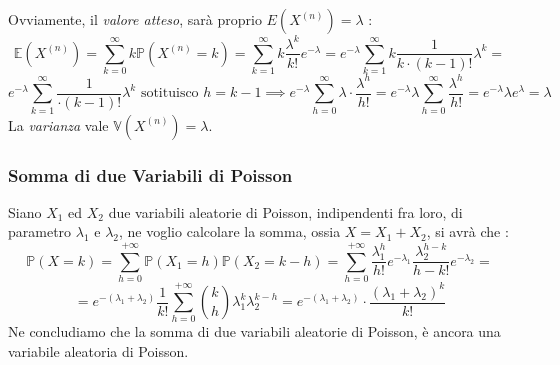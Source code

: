 \documentclass[12pt, letterpaper]{article}
\newcommand{\E}{{\mathbb E}}
\newcommand{\V}{{\mathbb V}}
\newcommand{\Prob}{{\mathbb P}}
\begin{document}
Ovviamente, il \textit{valore atteso}, sarà proprio  \(E(X^{(n)})=\lambda\) : \begin{equation}
    \E(X^{(n)})=\sum_{k=0}^\infty k\Prob(X^{(n)}=k)=\sum_{k=1}^\infty k\dfrac{\lambda^k}{k!}e^{-\lambda}=e^{-\lambda}\sum_{k=1}^\infty k\dfrac{1}{k\cdot(k-1)!}\lambda^k
=\end{equation}\begin{equation}
    e^{-\lambda}\sum_{k=1}^\infty \dfrac{1}{\cdot(k-1)!}\lambda^k \text{ sotituisco }h=k-1\implies e^{-\lambda}\sum_{h=0}^\infty\lambda\cdot\dfrac{\lambda^h}{h!}=
    e^{-\lambda}\lambda\sum_{h=0}^\infty\dfrac{\lambda^h}{h!}=e^{-\lambda}\lambda e^{\lambda}=\lambda
\end{equation}
La \textit{varianza} vale \(\V(X^{(n)})=\lambda\).
\subsubsection{Somma di due Variabili di Poisson}
Siano \(X_1\) ed \(X_2\) due variabili aleatorie di Poisson, indipendenti fra loro, di parametro \(\lambda_1\) e \(\lambda_2\),
ne voglio calcolare la somma, ossia \(X=X_1+X_2\), si avrà che : \begin{equation}
    \Prob(X=k)=\sum_{h=0}^{+\infty}\Prob(X_1=h)\Prob(X_2=k-h)=\sum_{h=0}^{+\infty}\dfrac{\lambda_1^h}{h!}e^{-\lambda_1}\dfrac{\lambda_2^{h-k}}{{h-k}!}e^{-\lambda_2}=
\end{equation}
\begin{equation}
    =e^{-(\lambda_1+\lambda_2)}\dfrac{1}{k!}\sum_{h=0}^{+\infty}\binom{k}{h}\lambda_1^k\lambda_2^{k-h}=e^{-(\lambda_1+\lambda_2)}\cdot\dfrac{(\lambda_1+\lambda_2)^k}{k!}
\end{equation}
Ne concludiamo che la somma di due variabili aleatorie di Poisson, è ancora una variabile aleatoria di Poisson.
\end{document}
